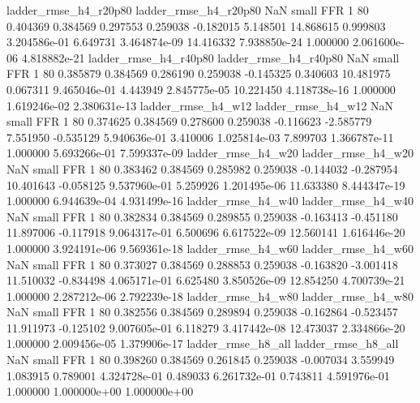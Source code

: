    ladder_rmse_h4_r20p80    ladder_rmse_h4_r20p80                   NaN      small      FFR                 1 80 0.404369       0.384569 0.297553       0.259038   -0.182015      5.148501     14.868615     0.999803   3.204586e-01  6.649731 3.464874e-09    14.416332   7.938850e-24            1.000000    2.061600e-06        4.818882e-21
   ladder_rmse_h4_r40p80    ladder_rmse_h4_r40p80                   NaN      small      FFR                 1 80 0.385879       0.384569 0.286190       0.259038   -0.145325      0.340603     10.481975     0.067311   9.465046e-01  4.443949 2.845775e-05    10.221450   4.118738e-16            1.000000    1.619246e-02        2.380631e-13
      ladder_rmse_h4_w12       ladder_rmse_h4_w12                   NaN      small      FFR                 1 80 0.374625       0.384569 0.278600       0.259038   -0.116623     -2.585779      7.551950    -0.535129   5.940636e-01  3.410006 1.025814e-03     7.899703   1.366787e-11            1.000000    5.693266e-01        7.599337e-09
      ladder_rmse_h4_w20       ladder_rmse_h4_w20                   NaN      small      FFR                 1 80 0.383462       0.384569 0.285982       0.259038   -0.144032     -0.287954     10.401643    -0.058125   9.537960e-01  5.259926 1.201495e-06    11.633380   8.444347e-19            1.000000    6.944639e-04        4.931499e-16
      ladder_rmse_h4_w40       ladder_rmse_h4_w40                   NaN      small      FFR                 1 80 0.382834       0.384569 0.289855       0.259038   -0.163413     -0.451180     11.897006    -0.117918   9.064317e-01  6.500696 6.617522e-09    12.560141   1.616446e-20            1.000000    3.924191e-06        9.569361e-18
      ladder_rmse_h4_w60       ladder_rmse_h4_w60                   NaN      small      FFR                 1 80 0.373027       0.384569 0.288853       0.259038   -0.163820     -3.001418     11.510032    -0.834498   4.065171e-01  6.625480 3.850526e-09    12.854250   4.700739e-21            1.000000    2.287212e-06        2.792239e-18
      ladder_rmse_h4_w80       ladder_rmse_h4_w80                   NaN      small      FFR                 1 80 0.382556       0.384569 0.289894       0.259038   -0.162864     -0.523457     11.911973    -0.125102   9.007605e-01  6.118279 3.417442e-08    12.473037   2.334866e-20            1.000000    2.009456e-05        1.379906e-17
      ladder_rmse_h8_all       ladder_rmse_h8_all                   NaN      small      FFR                 1 80 0.398260       0.384569 0.261845       0.259038   -0.007034      3.559949      1.083915     0.789001   4.324728e-01  0.489033 6.261732e-01     0.743811   4.591976e-01            1.000000    1.000000e+00        1.000000e+00
